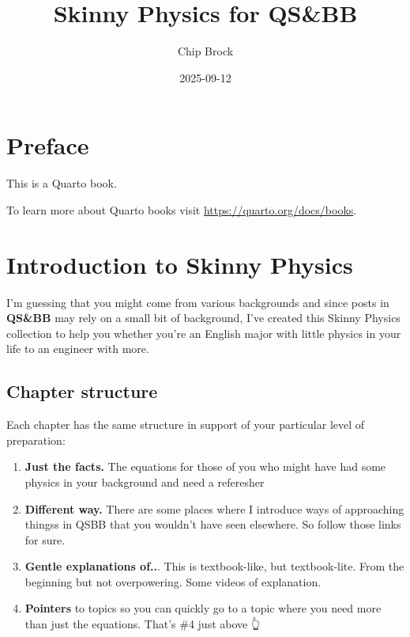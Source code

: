 \documentclass[
  letterpaper,
  DIV=11,
  numbers=noendperiod,
  oneside]{scrreprt}
\title{Skinny Physics for QS\&BB}
\author{Chip Brock}
\date{2025-09-12}
\providecommand{\tightlist}{%
  \setlength{\itemsep}{0pt}\setlength{\parskip}{0pt}}\usepackage{longtable,booktabs,array}
\renewcommand*\contentsname{Table of contents}
\newcommand\contentsname{Table of contents}
\begin{document}
\maketitle

\renewcommand*\contentsname{Table of contents}
{
\hypersetup{linkcolor=}
\setcounter{tocdepth}{2}
\tableofcontents
}


\chapter*{Preface}\label{preface}


This is a Quarto book.

To learn more about Quarto books visit
\url{https://quarto.org/docs/books}.


\chapter{Introduction to Skinny
Physics}\label{introduction-to-skinny-physics}

I'm guessing that you might come from various backgrounds and since
posts in \textbf{QS\&BB} may rely on a small bit of background, I've
created this Skinny Physics collection to help you whether you're an
English major with little physics in your life to an engineer with more.

\section{Chapter structure}\label{chapter-structure}

Each chapter has the same structure in support of your particular level
of preparation:

\begin{enumerate}
\def\labelenumi{\arabic{enumi}.}
\tightlist
\item
  \textbf{Just the facts.} The equations for those of you who might have
  had some physics in your background and need a referesher
\item
  \textbf{Different way.} There are some places where I introduce ways
  of approaching thingss in QSBB that you wouldn't have seen elsewhere.
  So follow those links for sure.
\item
  \textbf{Gentle explanations of..}. This is textbook-like, but
  textbook-lite. From the beginning but not overpowering. Some videos of
  explanation.
\item
  \textbf{Pointers} to topics so you can quickly go to a topic where you
  need more than just the equations. That's \#4 just above 👆
\end{enumerate}
\end{document}
